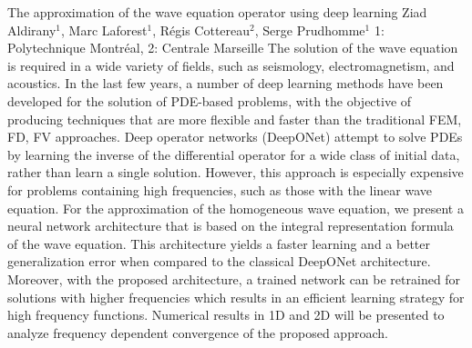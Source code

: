 \vspace{1.5ex}
\abs
{The approximation of the wave equation operator using deep learning }
{Ziad Aldirany$^{1}$, Marc Laforest$^{1}$, Régis Cottereau$^2$, Serge 
Prudhomme$^{1}$ }
{1: Polytechnique Montréal, 2: Centrale Marseille}
{The solution of the wave equation is required in a wide variety of 
fields, such as seismology, electromagnetism, and acoustics. In the 
last few years, a number of deep learning methods have been developed for the solution 
of PDE-based problems, with the objective of producing techniques that 
are more flexible and faster than the traditional FEM, FD, FV 
approaches. Deep operator networks (DeepONet) attempt to solve PDEs by 
learning the inverse of the differential operator for a wide class of 
initial data, rather than learn a single solution. However, this 
approach is especially expensive for problems containing high 
frequencies, such as those with the linear wave equation.
For the approximation of the homogeneous wave equation, we present a 
neural network architecture that is based on the integral 
representation formula of the wave equation.
This architecture yields a faster learning and a better generalization 
error when compared to the classical DeepONet architecture. Moreover, 
with the proposed architecture, a trained network can be retrained for 
solutions with higher frequencies which results in an efficient 
learning strategy for high frequency functions.
Numerical results in 1D and 2D will be presented to analyze frequency 
dependent convergence of the proposed approach. }


